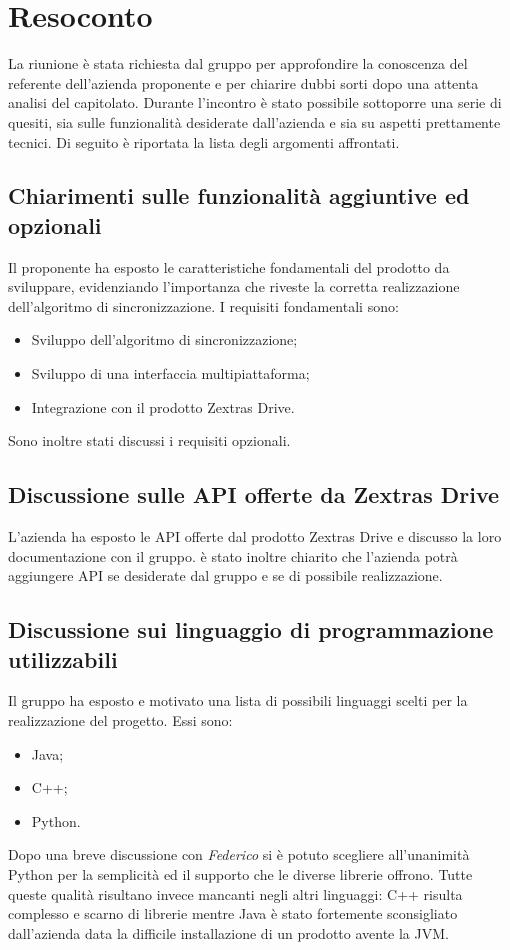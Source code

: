 \newpage


\section{Resoconto}
La riunione è stata richiesta dal gruppo \textit{\Gruppo{}} per approfondire la conoscenza del referente dell'azienda proponente e per chiarire dubbi sorti dopo una attenta analisi del capitolato.
Durante l'incontro è stato possibile sottoporre una serie di quesiti, sia sulle funzionalità desiderate dall'azienda e sia su aspetti prettamente tecnici.
Di seguito è riportata la lista degli argomenti affrontati.
\subsection{Chiarimenti sulle funzionalità aggiuntive ed opzionali}
Il proponente ha esposto le caratteristiche fondamentali del prodotto da sviluppare, evidenziando l'importanza che riveste la corretta realizzazione dell'algoritmo di sincronizzazione.
I requisiti fondamentali sono:
\begin{itemize}
	\item Sviluppo dell'algoritmo di sincronizzazione;
	\item Sviluppo di una interfaccia multipiattaforma;
	\item Integrazione con il prodotto Zextras Drive.
\end{itemize}
Sono inoltre stati discussi i requisiti opzionali.
\subsection{Discussione sulle API offerte da Zextras Drive}
L'azienda ha esposto le API offerte dal prodotto Zextras Drive e discusso la loro documentazione con il gruppo. è stato inoltre chiarito che l'azienda potrà aggiungere API se  desiderate dal gruppo e se di possibile realizzazione.
\subsection{Discussione sui linguaggio di programmazione utilizzabili}
Il gruppo ha esposto e motivato una lista di possibili linguaggi scelti per la realizzazione del progetto. Essi sono:
\begin{itemize}
	\item Java;
	\item C++;
	\item Python.
\end{itemize}
Dopo una breve discussione con \textit{Federico} si è potuto scegliere all'unanimità Python per la semplicità ed il supporto che le diverse librerie offrono. Tutte queste qualità risultano invece mancanti negli altri linguaggi: C++ risulta complesso e scarno di librerie mentre Java è stato fortemente sconsigliato dall'azienda data la difficile installazione di un prodotto avente la JVM.
